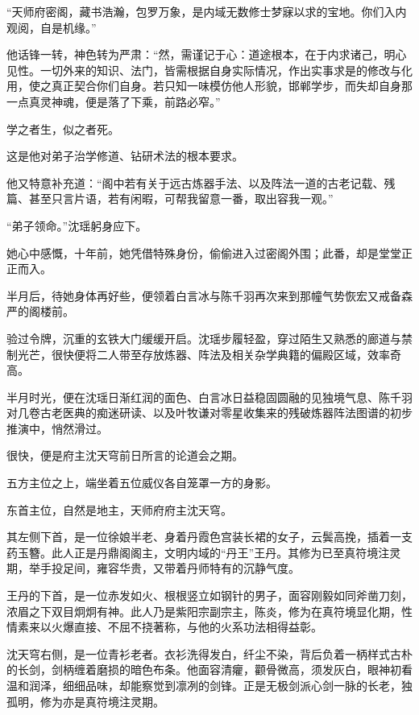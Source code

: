 “天师府密阁，藏书浩瀚，包罗万象，是内域无数修士梦寐以求的宝地。你们入内观阅，自是机缘。”

他话锋一转，神色转为严肃：“然，需谨记于心：道途根本，在于内求诸己，明心见性。一切外来的知识、法门，皆需根据自身实际情况，作出实事求是的修改与化用，使之真正契合你们自身。若只知一味模仿他人形貌，邯郸学步，而失却自身那一点真灵神魂，便是落了下乘，前路必窄。”

学之者生，似之者死。

这是他对弟子治学修道、钻研术法的根本要求。

他又特意补充道：“阁中若有关于远古炼器手法、以及阵法一道的古老记载、残篇、甚至只言片语，若有闲暇，可帮我留意一番，取出容我一观。”

“弟子领命。”沈瑶躬身应下。

她心中感慨，十年前，她凭借特殊身份，偷偷进入过密阁外围；此番，却是堂堂正正而入。

半月后，待她身体再好些，便领着白言冰与陈千羽再次来到那幢气势恢宏又戒备森严的阁楼前。

验过令牌，沉重的玄铁大门缓缓开启。沈瑶步履轻盈，穿过陌生又熟悉的廊道与禁制光芒，很快便将二人带至存放炼器、阵法及相关杂学典籍的偏殿区域，效率奇高。

\vspace{2em}

半月时光，便在沈瑶日渐红润的面色、白言冰日益稳固圆融的见独境气息、陈千羽对几卷古老医典的痴迷研读、以及叶牧谦对零星收集来的残破炼器阵法图谱的初步推演中，悄然滑过。

\vspace{2em}

很快，便是府主沈天穹前日所言的论道会之期。

五方主位之上，端坐着五位威仪各自笼罩一方的身影。

东首主位，自然是地主，天师府府主沈天穹。

其左侧下首，是一位徐娘半老、身着丹霞色宫装长裙的女子，云鬓高挽，插着一支药玉簪。此人正是丹鼎阁阁主，文明内域的“丹王”王丹。其修为已至真符境注灵期，举手投足间，雍容华贵，又带着丹师特有的沉静气度。

王丹的下首，是一位赤发如火、根根竖立如钢针的男子，面容刚毅如同斧凿刀刻，浓眉之下双目炯炯有神。此人乃是紫阳宗副宗主，陈炎，修为在真符境显化期，性情素来以火爆直接、不屈不挠著称，与他的火系功法相得益彰。

沈天穹右侧，是一位青衫老者。衣衫洗得发白，纤尘不染，背后负着一柄样式古朴的长剑，剑柄缠着磨损的暗色布条。他面容清癯，颧骨微高，须发灰白，眼神初看温和润泽，细细品味，却能察觉到凛冽的剑锋。正是无极剑派心剑一脉的长老，独孤明，修为亦是真符境注灵期。

